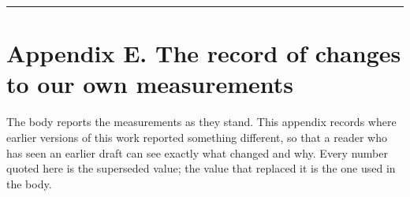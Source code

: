 \documentclass[authoryear,review,3p,times]{elsarticle}
\begin{document}
\begin{center}\rule{0.5\linewidth}{0.5pt}\end{center}

\section{Appendix E. The record of changes to our own measurements}\label{appendix-e.-the-record-of-changes-to-our-own-measurements}

The body reports the measurements as they stand. This appendix records where earlier versions of this work reported something different, so that a reader who has seen an earlier draft can see exactly what changed and why. Every number quoted here is the superseded value; the value that replaced it is the one used in the body.
\end{document}
